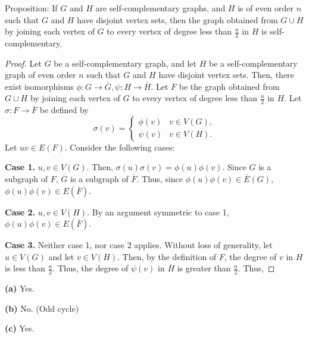\documentclass[12pt]{article}
\begin{document}
\newpage{} Proposition: If $G$ and $H$ are self-complementary graphs, and $H$ is of even order $n$ such that $G$ and $H$ have disjoint vertex sets, then the graph obtained from $G \cup H$ by joining each vertex of $G$ to every vertex of degree less than $\frac n2$ in $H$ is self-complementary.
\begin{proof}
    Let $G$ be a self-complementary graph, and let $H$ be a self-complementary graph of even order $n$ such that $G$ and $H$ have disjoint vertex sets.
    Then, there exist isomorphisms $\phi: G \to \overline G, \psi: H \to \overline H$.
    Let $F$ be the graph obtained from $G \cup H$ by joining each vertex of $G$ to every vertex of degree less than $\frac n2$ in $H$.
    Let $\sigma: F \to \overline F$ be defined by $$\sigma(v) = \begin{cases} \phi(v) & v \in V(G), \\ \psi(v) & v \in V(H). \end{cases}$$
    Let $uv \in E(F)$. Consider the following cases:
    
    {\bf Case 1.} $u,v \in V(G)$.
    Then, $\sigma(u)\sigma(v) = \phi(u)\phi(v)$.
    Since $G$ is a subgraph of $F$, $\overline G$ is a subgraph of $\overline F$.
    Thus, since $\phi(u)\phi(v) \in \overline E(G)$, $\phi(u)\phi(v) \in E(\overline F)$.

    {\bf Case 2.} $u,v \in V(H)$.
    By an argument symmetric to case 1, $\phi(u)\phi(v) \in E(\overline F)$.

    {\bf Case 3.} Neither case 1, nor case 2 applies.
    Without loss of generality, let $u \in V(G)$ and let $v \in V(H)$.
    Then, by the definition of $F$, the degree of $v$ in $H$ is less than $\frac n2$.
    Thus, the degree of $\psi(v)$ in $\overline H$ is greater than $\frac n2$.
    Thus,
\end{proof}
\newpage{}

\newpage{}

{\bf (a)} Yes.

{\bf (b)} No. (Odd cycle)

{\bf (c)} Yes.
\end{document}
